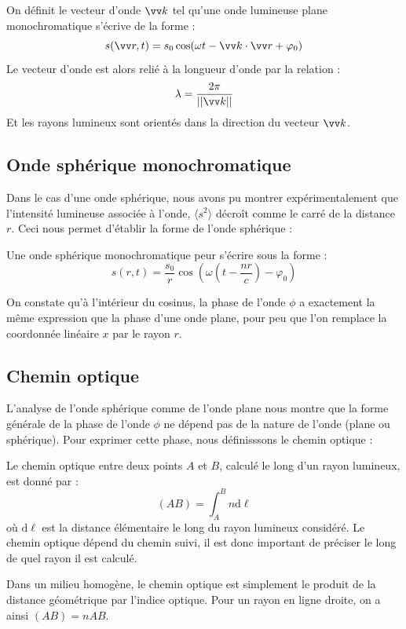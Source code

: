 \documentclass[11pt,fleqn]{book} %
\newcommand{\dd}{\mathrm{d}}
\begin{document}
\begin{definition}
On définit le vecteur d'onde $\vv k$ tel qu'une onde lumineuse plane monochromatique s'écrive de la forme :
\begin{equation}
	s(\vv r,t) = s_0 \cos(\omega t - \vv k \cdot \vv r + \varphi_0)
\end{equation}
Le vecteur d'onde est alors relié à la longueur d'onde par la relation :
\begin{equation}
	\lambda = \frac{2\pi}{||\vv k||}
\end{equation}
Et les rayons lumineux sont orientés dans la direction du vecteur $\vv k$.
\end{definition}

\subsection{Onde sphérique monochromatique}

Dans le cas d'une onde sphérique, nous avons pu montrer expérimentalement que l'intensité lumineuse associée à l'onde, $\langle s^2 \rangle$ décroît comme le carré de la distance $r$. Ceci nous permet d'établir la forme de l'onde sphérique :
\begin{proposition}
Une onde sphérique monochromatique peur s'écrire sous la forme :
\begin{equation}
	s(r,t) = \frac{s_0}{r} \cos\left(\omega\left(t-\frac{n r}{c}\right) - \varphi_0\right)
\end{equation}
\end{proposition}
On constate qu'à l'intérieur du cosinus, la phase de l'onde $\phi$ a exactement la même expression que la phase d'une onde plane, pour peu que l'on remplace la coordonnée linéaire $x$ par le rayon $r$.

\subsection{Chemin optique}

L'analyse de l'onde sphérique comme de l'onde plane nous montre que la forme générale de la phase de l'onde $\phi$ ne dépend pas de la nature de l'onde (plane ou sphérique). Pour exprimer cette phase, nous définisssons le chemin optique :
\begin{definition}
	Le chemin optique entre deux points $A$ et $B$, calculé le long d'un rayon lumineux, est donné par :
	\begin{equation}
		(AB) = \int_A^B n \dd \ell
	\end{equation}
	où $\dd \ell$ est la distance élémentaire le long du rayon lumineux considéré. Le chemin optique dépend du chemin suivi, il est donc important de préciser le long de quel rayon il est calculé.
\end{definition}
\begin{remark}
	Dans un milieu homogène, le chemin optique est simplement le produit de la distance géométrique par l’indice optique. Pour un rayon en ligne droite, on a ainsi $(AB) = n AB$.
\end{remark}
\end{document}
